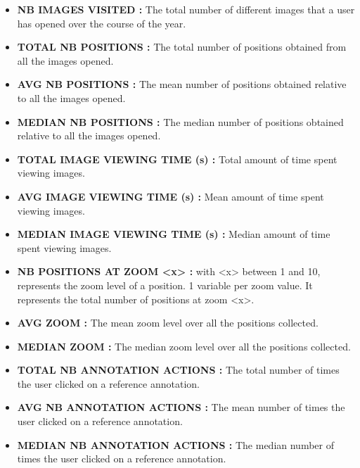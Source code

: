 \documentclass[a4paper,11pt]{report}
\numberwithin{figure}{section} %
\begin{document}
   \begin{itemize}
    \item[\textbullet] \textbf{NB IMAGES VISITED :} The total number of different images that a user has opened over the course of the year.\\
    \item[\textbullet] \textbf{TOTAL NB POSITIONS :} The total number of positions obtained from all the images opened.\\
    \item[\textbullet] \textbf{AVG NB POSITIONS :} The mean number of positions obtained relative to all the images opened.\\

    \item[\textbullet] \textbf{MEDIAN NB POSITIONS :} The median number of positions  obtained relative to all the images opened.\\
    \item[\textbullet] \textbf{TOTAL IMAGE VIEWING TIME (s) :} Total amount of time spent viewing images.\\

    \item[\textbullet] \textbf{AVG IMAGE VIEWING TIME (s) :} Mean amount of time spent viewing images.\\

    \item[\textbullet] \textbf{MEDIAN IMAGE VIEWING TIME (s) :} Median amount of time spent viewing images.\\

    \item[\textbullet] \textbf{NB POSITIONS AT ZOOM <x> :} with <x> between 1 and 10, represents the zoom level of a position.
    1 variable per zoom value.
    It represents the total number of positions at zoom <x>.\\
    \item[\textbullet] \textbf{AVG ZOOM :} The mean zoom level over all the positions collected.\\
    \item[\textbullet] \textbf{MEDIAN ZOOM :} The median zoom level over all the positions collected.\\
    \item[\textbullet] \textbf{TOTAL NB ANNOTATION ACTIONS :} The total number of times the user clicked on a reference annotation.\\
    \item[\textbullet] \textbf{AVG NB ANNOTATION ACTIONS :} The mean number of times the user clicked on a reference annotation.\\
    \item[\textbullet] \textbf{MEDIAN NB ANNOTATION ACTIONS :} The median number of times the user clicked on a reference annotation.\\


\end{itemize}
\end{document}
